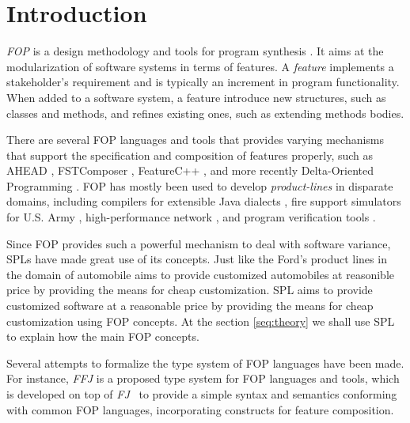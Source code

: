 \chapter{Introduction}
\textit{\gls{FOP}} \cite{prehofer_feature-oriented_1997} is a design methodology and tools for program synthesis \cite{batory_tutorial_2003}.
It aims at the modularization of software systems in terms of features. A \textit{feature}
implements a stakeholder's requirement and is typically an increment in program functionality.
When added to a software system, a feature introduce new structures, such as classes and methods,
and refines existing ones, such as extending methods bodies.

There are several \gls{FOP} languages and tools that provides varying mechanisms
that support the specification and composition of features properly, such as AHEAD \cite{batory_feature-oriented_2004},
FSTComposer \cite{apel_superimposition:_2008}, FeatureC++ \cite{apel_featurec++:_2005}, and more recently Delta-Oriented Programming \cite{schaefer_delta-oriented_2010}. \gls{FOP} has mostly been used to develop
\textit{product-lines} in disparate domains, including compilers for extensible Java dialects 
\cite{batory_jts:_1998}, fire support simulators for U.S. Army \cite{batory_achieving_2000}, high-performance network
\cite{batory_design_1992}, and program verification tools \cite{kurt_stirewalt_component-based_2001}.

Since \gls{FOP} provides such a powerful mechanism to deal with software variance, \glspl{SPL} have made great use of its concepts.
Just like the Ford's product lines in the domain of automobile aims to provide customized automobiles at reasonible price by providing
the means for cheap customization. \gls{SPL} aims to provide customized software at a reasonable price by providing the means for cheap customization using
\gls{FOP} concepts. At the section \ref{seq:theory} we shall use \gls{SPL} to explain how the main \gls{FOP} concepts.

Several attempts to formalize the type system of \gls{FOP} languages have been made. %
For instance,  \textit{\gls{FFJ}} \cite{apel_feature_2008} is a proposed type system for \gls{FOP} languages and tools, 
which is developed on top of \textit{\gls{FJ}}~\cite{igarashi_featherweight_2001}
to provide a simple syntax and semantics conforming with common \gls{FOP} languages, 
incorporating constructs for feature composition. %

